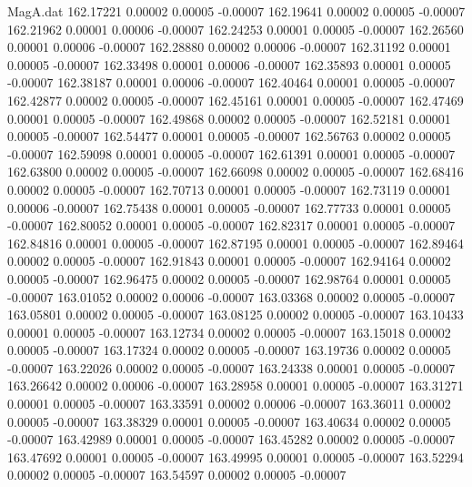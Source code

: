 \begin{filecontents}{MagA.dat}
 162.17221    0.00002    0.00005   -0.00007
 162.19641    0.00002    0.00005   -0.00007
 162.21962    0.00001    0.00006   -0.00007
 162.24253    0.00001    0.00005   -0.00007
 162.26560    0.00001    0.00006   -0.00007
 162.28880    0.00002    0.00006   -0.00007
 162.31192    0.00001    0.00005   -0.00007
 162.33498    0.00001    0.00006   -0.00007
 162.35893    0.00001    0.00005   -0.00007
 162.38187    0.00001    0.00006   -0.00007
 162.40464    0.00001    0.00005   -0.00007
 162.42877    0.00002    0.00005   -0.00007
 162.45161    0.00001    0.00005   -0.00007
 162.47469    0.00001    0.00005   -0.00007
 162.49868    0.00002    0.00005   -0.00007
 162.52181    0.00001    0.00005   -0.00007
 162.54477    0.00001    0.00005   -0.00007
 162.56763    0.00002    0.00005   -0.00007
 162.59098    0.00001    0.00005   -0.00007
 162.61391    0.00001    0.00005   -0.00007
 162.63800    0.00002    0.00005   -0.00007
 162.66098    0.00002    0.00005   -0.00007
 162.68416    0.00002    0.00005   -0.00007
 162.70713    0.00001    0.00005   -0.00007
 162.73119    0.00001    0.00006   -0.00007
 162.75438    0.00001    0.00005   -0.00007
 162.77733    0.00001    0.00005   -0.00007
 162.80052    0.00001    0.00005   -0.00007
 162.82317    0.00001    0.00005   -0.00007
 162.84816    0.00001    0.00005   -0.00007
 162.87195    0.00001    0.00005   -0.00007
 162.89464    0.00002    0.00005   -0.00007
 162.91843    0.00001    0.00005   -0.00007
 162.94164    0.00002    0.00005   -0.00007
 162.96475    0.00002    0.00005   -0.00007
 162.98764    0.00001    0.00005   -0.00007
 163.01052    0.00002    0.00006   -0.00007
 163.03368    0.00002    0.00005   -0.00007
 163.05801    0.00002    0.00005   -0.00007
 163.08125    0.00002    0.00005   -0.00007
 163.10433    0.00001    0.00005   -0.00007
 163.12734    0.00002    0.00005   -0.00007
 163.15018    0.00002    0.00005   -0.00007
 163.17324    0.00002    0.00005   -0.00007
 163.19736    0.00002    0.00005   -0.00007
 163.22026    0.00002    0.00005   -0.00007
 163.24338    0.00001    0.00005   -0.00007
 163.26642    0.00002    0.00006   -0.00007
 163.28958    0.00001    0.00005   -0.00007
 163.31271    0.00001    0.00005   -0.00007
 163.33591    0.00002    0.00006   -0.00007
 163.36011    0.00002    0.00005   -0.00007
 163.38329    0.00001    0.00005   -0.00007
 163.40634    0.00002    0.00005   -0.00007
 163.42989    0.00001    0.00005   -0.00007
 163.45282    0.00002    0.00005   -0.00007
 163.47692    0.00001    0.00005   -0.00007
 163.49995    0.00001    0.00005   -0.00007
 163.52294    0.00002    0.00005   -0.00007
 163.54597    0.00002    0.00005   -0.00007

\end{filecontents}
